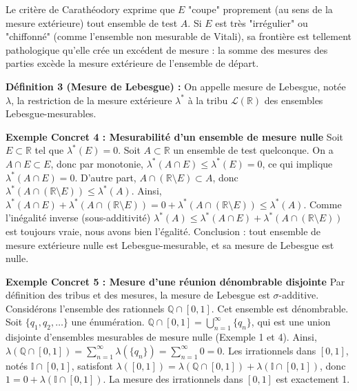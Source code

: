 \documentclass[11pt,a4paper]{article}
\begin{document}
Le critère de Carathéodory exprime que $E$ "coupe" proprement (au sens de la mesure extérieure) tout ensemble de test $A$. Si $E$ est très "irrégulier" ou "chiffonné" (comme l'ensemble non mesurable de Vitali), sa frontière est tellement pathologique qu'elle crée un excédent de mesure : la somme des mesures des parties excède la mesure extérieure de l'ensemble de départ.

\textbf{Définition 3 (Mesure de Lebesgue) :}
On appelle mesure de Lebesgue, notée $\lambda$, la restriction de la mesure extérieure $\lambda^*$ à la tribu $\mathcal{L}(\mathbb{R})$ des ensembles Lebesgue-mesurables.

\textbf{Exemple Concret 4 : Mesurabilité d'un ensemble de mesure nulle}
Soit $E \subset \mathbb{R}$ tel que $\lambda^*(E) = 0$.
Soit $A \subset \mathbb{R}$ un ensemble de test quelconque.
On a $A \cap E \subset E$, donc par monotonie, $\lambda^*(A \cap E) \le \lambda^*(E) = 0$, ce qui implique $\lambda^*(A \cap E) = 0$.
D'autre part, $A \cap (\mathbb{R} \setminus E) \subset A$, donc $\lambda^*(A \cap (\mathbb{R} \setminus E)) \le \lambda^*(A)$.
Ainsi, $\lambda^*(A \cap E) + \lambda^*(A \cap (\mathbb{R} \setminus E)) = 0 + \lambda^*(A \cap (\mathbb{R} \setminus E)) \le \lambda^*(A)$.
Comme l'inégalité inverse (sous-additivité) $\lambda^*(A) \le \lambda^*(A \cap E) + \lambda^*(A \cap (\mathbb{R} \setminus E))$ est toujours vraie, nous avons bien l'égalité.
Conclusion : tout ensemble de mesure extérieure nulle est Lebesgue-mesurable, et sa mesure de Lebesgue est nulle.

\textbf{Exemple Concret 5 : Mesure d'une réunion dénombrable disjointe}
Par définition des tribus et des mesures, la mesure de Lebesgue est $\sigma$-additive.
Considérons l'ensemble des rationnels $\mathbb{Q} \cap [0, 1]$. Cet ensemble est dénombrable. Soit $\{q_1, q_2, \dots \}$ une énumération.
$\mathbb{Q} \cap [0, 1] = \bigcup_{n=1}^\infty \{q_n\}$, qui est une union disjointe d'ensembles mesurables de mesure nulle (Exemple 1 et 4).
Ainsi, $\lambda(\mathbb{Q} \cap [0, 1]) = \sum_{n=1}^\infty \lambda(\{q_n\}) = \sum_{n=1}^\infty 0 = 0$.
Les irrationnels dans $[0, 1]$, notés $\mathbb{I} \cap [0, 1]$, satisfont $\lambda([0, 1]) = \lambda(\mathbb{Q} \cap [0, 1]) + \lambda(\mathbb{I} \cap [0, 1])$, donc $1 = 0 + \lambda(\mathbb{I} \cap [0, 1])$.
La mesure des irrationnels dans $[0, 1]$ est exactement 1.
\end{document}
